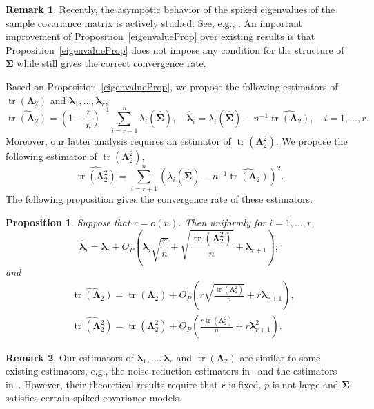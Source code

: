 \documentclass[12pt]{article} %
\DeclareMathOperator{\mytr}{tr}
\newcommand{\bZ}{\mathbf{Z}}
\newcommand{\bfsym}[1]{\ensuremath{\boldsymbol{#1}}}
\def\blambda {\bfsym {\lambda}}
\def\bLambda {\bfsym {\Lambda}}
\def\bSigma {\bfsym {\Sigma}}
\newtheorem{proposition}{Proposition}
\theoremstyle{definition}
\newtheorem{remark}{Remark}
\begin{document}
\begin{remark}
    Recently, the asympotic behavior of the spiked eigenvalues of the sample covariance matrix is actively studied.
    See, e.g., \cite{Yata2013PCA,Shen2016A,wang2017As,Cai2017Limiting}.
    An important improvement of Proposition~\ref{eigenvalueProp} over existing results is that Proposition~\ref{eigenvalueProp} does not impose any condition for the structure of $\bSigma$ while still gives the correct convergence rate.
\end{remark}

Based on Proposition~\ref{eigenvalueProp}, we propose the following estimators of  $\mytr(\bLambda_2)$ and $\blambda_1,\ldots,\blambda_r$,
\begin{equation*}
    \widehat{\mytr(\bLambda_2)}=\left(1-\frac{r}{n}\right)^{-1}\sum_{i=r+1}^n \lambda_i (\hat{\bSigma})
    ,\quad
    \hat{\blambda}_i=\lambda_i(\hat{\bSigma})-n^{-1}\widehat{\mytr(\bLambda_2)},\quad i=1,\ldots,r.
\end{equation*}
Moreover, our latter analysis requires an estimator of $\mytr(\bLambda_2^2)$.
We propose the following estimator of $\mytr(\bLambda_2^2)$,
\begin{equation*}
    \widehat{\mytr(\bLambda_2^2)}=\sum_{i=r+1}^n \left(\lambda_i(\hat{\bSigma})-n^{-1}\widehat{\mytr(\bLambda_2)}\right)^2.
\end{equation*}
The following proposition gives the convergence rate of these estimators.
\begin{proposition}
    \label{eigenvalueProp:R3}
    Suppose that $r=o(n)$.
    Then uniformly for $i=1,\ldots, r$, 
\begin{equation*}
    \hat{\blambda}_i
        =
        \blambda_i
        +O_P\left(\blambda_i \sqrt{\frac{r}{n}}+\sqrt{\frac{\mytr(\bLambda_2^2)}{ n}}+\blambda_{r+1}\right);
\end{equation*}
and
\begin{align*}
    &\widehat{\mytr(\bLambda_2)}=\mytr(\bLambda_2) + O_P\left(r\sqrt{\frac{\mytr(\bLambda_2^2)}{n}}+r\blambda_{r+1}\right),
        \\
&\widehat{\mytr(\bLambda_2^2)}
        =
         \mytr(\bLambda_2^2)
        +
        O_P\left(\frac{r \mytr(\bLambda_2^2)}{n} + r  \blambda_{r+1}^2\right).
\end{align*}
\end{proposition}
\begin{remark}
    Our estimators of $\blambda_1,\ldots, \blambda_r$ and $\mytr(\bLambda_2)$ are similar to some existing estimators, e.g., the noise-reduction estimators in~\cite{YATA2012193} and the estimators in~\cite{wang2017As}.
    However, their theoretical results require that $r$ is fixed, $p$ is not large and $\bSigma$ satisfies certain spiked covariance models.
\end{remark}
\end{document}
